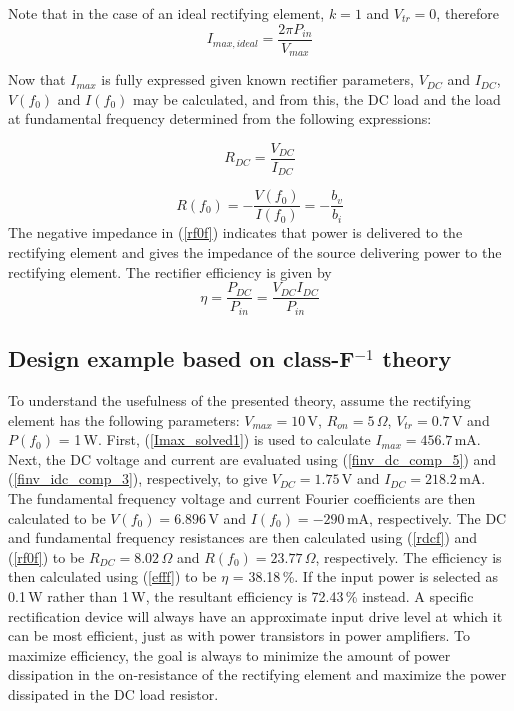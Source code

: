Note that in the case of an ideal rectifying element, $k = 1$ and $V_{tr} = 0$, therefore
\begin{equation}\label{Imax_solve_zeroron_solved_ideal}
    I_{max,ideal} = \frac{2\pi P_{in}}{V_{max}}
\end{equation}

Now that $I_{max}$ is fully expressed given known rectifier parameters, $V_{DC}$ and $I_{DC}$, $V(f_0)$ and $I(f_0)$ may be calculated, and from this, the DC load and the load at fundamental frequency determined from the following expressions:

\begin{equation}\label{rdcf}
    R_{DC} = \frac{V_{DC}}{I_{DC}}
\end{equation}

\begin{equation}\label{rf0f}
    R(f_0) = -\frac{V(f_0)}{I(f_0)} = -\frac{b_v}{b_i}
\end{equation}
The negative impedance in (\ref{rf0f}) indicates that power is delivered to the rectifying element and gives the impedance of the source delivering power to the rectifying element.  The rectifier efficiency is given by
\begin{equation}\label{efff}
    \eta = \frac{P_{DC}}{P_{in}} = \frac{V_{DC}I_{DC}}{P_{in}}
\end{equation}










\subsection {Design example based on class-F$^{-1}$ theory}

To understand the usefulness of the presented theory, assume the rectifying element has the following parameters: $V_{max} = 10$\,V, $R_{on} = 5$\,$\Omega$, $V_{tr} = 0.7$\,V and $P(f_0)$ = 1\,W.  First, (\ref{Imax_solved1}) is used to calculate $I_{max}=456.7$\,mA. Next, the DC voltage and current are evaluated using (\ref{finv_dc_comp_5}) and (\ref{finv_idc_comp_3}), respectively, to give $V_{DC}=1.75$\,V and $I_{DC}=218.2$\,mA. The fundamental frequency voltage and current Fourier coefficients are then calculated to be $V(f_0)=6.896$\,V and $I(f_0)=-290$\,mA, respectively.  The DC and fundamental frequency resistances are then calculated using (\ref{rdcf}) and (\ref{rf0f}) to be $R_{DC}=8.02$\,$\Omega$ and $R(f_0)=23.77$\,$\Omega$, respectively.  The efficiency is then calculated using (\ref{efff}) to be $\eta$ = 38.18\,\%. If the input power is selected as 0.1\,W rather than 1\,W, the resultant efficiency is 72.43\,\% instead.  A specific rectification device will always have an approximate input drive level at which it can be most efficient, just as with power transistors in power amplifiers. To maximize efficiency, the goal is always to minimize the amount of power dissipation in the on-resistance of the rectifying element and maximize the power dissipated in the DC load resistor.










